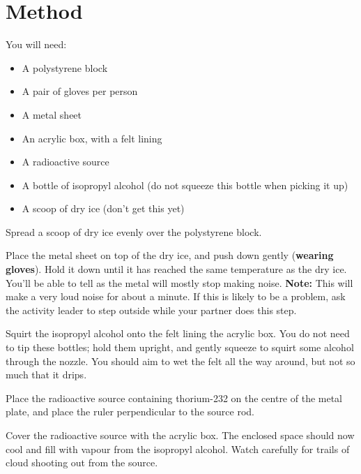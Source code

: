 \documentclass{article}
\begin{document}
\section{Method}

You will need:
\begin{multicols}{2}
\begin{itemize}
    \item A polystyrene block
    \item A pair of gloves per person
    \item A metal sheet
    \item An acrylic box, with a felt lining
    \item A radioactive source
    \item A bottle of isopropyl alcohol (do not squeeze this bottle when picking
    it up)
    \item A scoop of dry ice (don't get this yet)
\end{itemize}
\end{multicols}


\Step{} Spread a scoop of dry ice evenly over the polystyrene block.


\Step{} Place the metal sheet on top of the dry ice, and push down gently
(\textbf{wearing gloves}). Hold it down until it has reached the same
temperature as the dry ice. You'll be able to tell as the metal will mostly stop
making noise. \textbf{Note:} This will make a very loud noise for about a
minute. If this is likely to be a problem, ask the activity leader to step
outside while your partner does this step.

\Step{} Squirt the isopropyl alcohol onto the felt lining the acrylic box. You
do not need to tip these bottles; hold them upright, and gently squeeze to
squirt some alcohol through the nozzle. You should aim to wet the felt all the
way around, but not so much that it drips.


\Step{} Place the radioactive source containing thorium-232 on the centre of the
metal plate, and place the ruler perpendicular to the source rod.


\Step{} Cover the radioactive source with the acrylic box. The enclosed space
should now cool and fill with vapour from the isopropyl alcohol. Watch carefully
for trails of cloud shooting out from the source.
\end{document}
